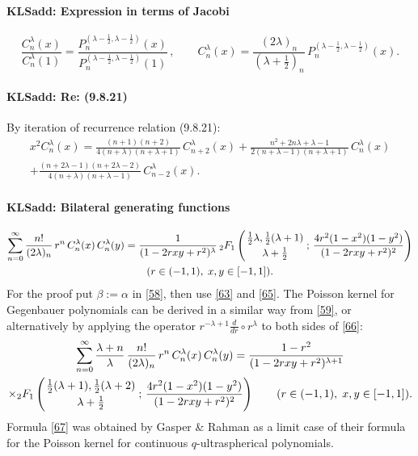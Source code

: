 \documentclass[envcountchap,graybox]{svmono}
\newcounter{rom}
\newcommand{\hyp}[5]{\mbox{}_{#1}{F}_{#2}
\left(\genfrac{}{}{0pt}{}{#3}{#4}\,;\,#5\right)}
\newcommand\al\alpha
\newcommand\be\beta
\newcommand\la\lambda
\newcommand\half{\frac12}
\newcommand\thalf{\tfrac12}
\newcommand\iy\infty
\newcommand{\hyp}[5]{\,\mbox{}_{#1}F_{#2}\!\left(
  \genfrac{}{}{0pt}{}{#3}{#4};#5\right)}
\begin{document}
\paragraph{\large\bf KLSadd: Expression in terms of Jacobi}%
\begin{equation}
\frac{C_n^\la(x)}{C_n^\la(1)}=
\frac{P_n^{(\la-\half,\la-\half)}(x)}{P_n^{(\la-\half,\la-\half)}(1)}\,,\qquad
C_n^\la(x)=\frac{(2\la)_n}{(\la+\thalf)_n}\,P_n^{(\la-\half,\la-\half)}(x).
\label{65}
\end{equation}
%
\paragraph{\large\bf KLSadd: Re: (9.8.21)}By iteration of recurrence relation (9.8.21):
\begin{multline}
x^2 C_n^\la(x)=
\frac{(n+1)(n+2)}{4(n+\la)(n+\la+1)}\,C_{n+2}^\la(x)+
\frac{n^2+2n\la+\la-1}{2(n+\la-1)(n+\la+1)}\,C_n^\la(x)\\
+\frac{(n+2\la-1)(n+2\la-2)}{4(n+\la)(n+\la-1)}\,C_{n-2}^\la(x).
\label{6}
\end{multline}
%
\paragraph{\large\bf KLSadd: Bilateral generating functions}\begin{multline}
\sum_{n=0}^\iy\frac{n!}{(2\la)_n}\,r^n\,C_n^\la(x)\,C_n^\la(y)
=\frac1{(1-2rxy+r^2)^\la}\,\hyp21{\thalf\la,\thalf(\la+1)}{\la+\thalf}
{\frac{4r^2(1-x^2)(1-y^2)}{(1-2rxy+r^2)^2}}\\
(r\in(-1,1),\;x,y\in[-1,1]).
\label{66}
\end{multline}
For the proof put $\be:=\al$ in \eqref{58}, then use \eqref{63} and \eqref{65}.
The Poisson kernel for Gegenbauer polynomials can be derived in a similar way
from \eqref{59}, or alternatively by applying the operator
$r^{-\la+1}\frac d{dr}\circ r^\la$ to both sides of \eqref{66}:
\begin{multline}
\sum_{n=0}^\iy\frac{\la+n}\la\,\frac{n!}{(2\la)_n}\,r^n\,C_n^\la(x)\,C_n^\la(y)
=\frac{1-r^2}{(1-2rxy+r^2)^{\la+1}}\\
\times\hyp21{\thalf(\la+1),\thalf(\la+2)}{\la+\thalf}
{\frac{4r^2(1-x^2)(1-y^2)}{(1-2rxy+r^2)^2}}\qquad
(r\in(-1,1),\;x,y\in[-1,1]).
\label{67}
\end{multline}
Formula \eqref{67} was obtained by Gasper \& Rahman 
as a limit case of their formula for the Poisson kernel for continuous
$q$-ultraspherical polynomials.
%
\end{document}
